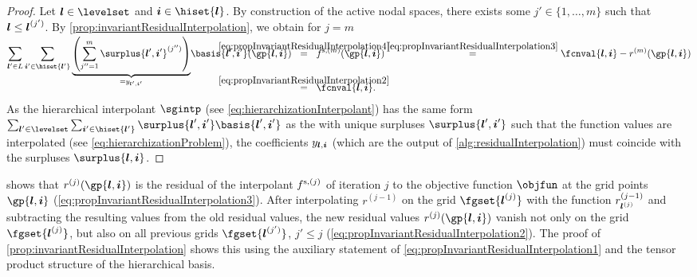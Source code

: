 \begin{proof}
  Let $\*l \in \levelset$ and $\*i \in \hiset{\*l}$.
  By construction of the active nodal spaces,
  there exists some $j' \in \{1, \dotsc, m\}$ such that ${\boldsymbol{l}} \le {\boldsymbol{l}}^{(j')}$.
  By \cref{prop:invariantResidualInterpolation}, we obtain
  for $j = m$
  \begin{subequations}
    \begin{align}
      \sum_{\*l' \in L} \sum_{\*i' \in \hiset{\*l'}}
      \smash{
        \underbrace{
          \left(\sum_{j''=1}^{m} \surplus{\*l',\*i'}^{(j'')}\right)
        }_{= \linout{\*l',\*i'}}
      }
      \basis{\*l',\*i'}(\gp{\*l,\*i})
      &\quad\;
      \mathclap{\overset{\eqref{eq:propInvariantResidualInterpolation4}}{=}}
      \quad\;
      f^{\sparse,(m)}(\gp{\*l,\*i})
      \overset{\eqref{eq:propInvariantResidualInterpolation3}}{=}
      \fcnval{\*l,\*i} - r^{(m)}(\gp{\*l,\*i})\\
      &\quad\;
      \mathclap{\overset{\eqref{eq:propInvariantResidualInterpolation2}}{=}}
      \quad\;
      \fcnval{\*l,\*i}.
    \end{align}
  \end{subequations}
  As the hierarchical interpolant $\sgintp$
  (see \eqref{eq:hierarchizationInterpolant})
  has the same form
  $\sum_{\*l' \in \levelset} \sum_{\*i' \in \hiset{\*l'}}
  \surplus{\*l',\*i'} \basis{\*l',\*i'}$ as the \lhs
  with unique surpluses $\surplus{\*l',\*i'}$ such that the function values
  are interpolated (see \eqref{eq:hierarchizationProblem}),
  the coefficients $y_{{\boldsymbol{l}},{\boldsymbol{i}}}$
  (which are the output of \cref{alg:residualInterpolation})
  must coincide with the surpluses $\surplus{\*l,\*i}$.
\end{proof}

 shows that
$r^{(j)}(\gp{\*l,\*i})$ is the residual of the
interpolant $f^{\mathrm{s},(j)}$ of iteration $j$
to the objective function $\objfun$ at the grid points $\gp{\*l,\*i}$
(\cref{eq:propInvariantResidualInterpolation3}).
After interpolating $r^{(j-1)}$ on the grid $\fgset{\*l^{(j)}}$
with the function $r_{{\boldsymbol{l}}^{(j)}}^{(j-1)}$
and subtracting the resulting values from the old residual values,
the new residual values $r^{(j)}(\gp{\*l,\*i})$ vanish
not only on the grid $\fgset{\*l^{(j)}}$,
but also on all previous grids $\fgset{\*l^{(j')}}$, $j' \le j$
(\cref{eq:propInvariantResidualInterpolation2}).
The proof of \cref{prop:invariantResidualInterpolation}
shows this using the auxiliary statement of
\cref{eq:propInvariantResidualInterpolation1}
and the tensor product structure of the hierarchical basis.

